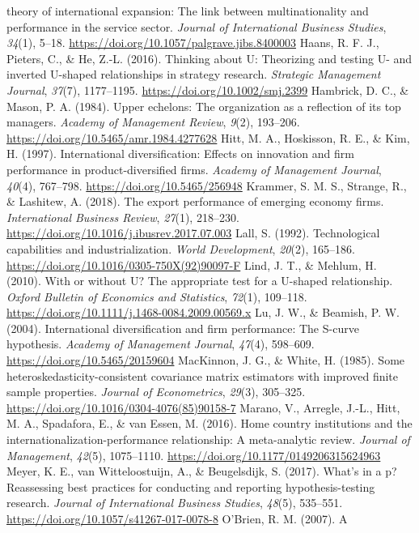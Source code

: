 \documentclass[12pt,a4paper]{article}
\begin{document}
theory of international expansion: The link between multinationality and
performance in the service sector. \emph{Journal of International
Business Studies}, \emph{34}(1), 5--18.
\url{https://doi.org/10.1057/palgrave.jibs.8400003} Haans, R. F. J.,
Pieters, C., \& He, Z.-L. (2016). Thinking about U: Theorizing and
testing U- and inverted U-shaped relationships in strategy research.
\emph{Strategic Management Journal}, \emph{37}(7), 1177--1195.
\url{https://doi.org/10.1002/smj.2399} Hambrick, D. C., \& Mason, P. A.
(1984). Upper echelons: The organization as a reflection of its top
managers. \emph{Academy of Management Review}, \emph{9}(2), 193--206.
\url{https://doi.org/10.5465/amr.1984.4277628} Hitt, M. A., Hoskisson,
R. E., \& Kim, H. (1997). International diversification: Effects on
innovation and firm performance in product-diversified firms.
\emph{Academy of Management Journal}, \emph{40}(4), 767--798.
\url{https://doi.org/10.5465/256948} Krammer, S. M. S., Strange, R., \&
Lashitew, A. (2018). The export performance of emerging economy firms.
\emph{International Business Review}, \emph{27}(1), 218--230.
\url{https://doi.org/10.1016/j.ibusrev.2017.07.003} Lall, S. (1992).
Technological capabilities and industrialization. \emph{World
Development}, \emph{20}(2), 165--186.
\url{https://doi.org/10.1016/0305-750X(92)90097-F} Lind, J. T., \&
Mehlum, H. (2010). With or without U? The appropriate test for a
U-shaped relationship. \emph{Oxford Bulletin of Economics and
Statistics}, \emph{72}(1), 109--118.
\url{https://doi.org/10.1111/j.1468-0084.2009.00569.x} Lu, J. W., \&
Beamish, P. W. (2004). International diversification and firm
performance: The S-curve hypothesis. \emph{Academy of Management
Journal}, \emph{47}(4), 598--609. \url{https://doi.org/10.5465/20159604}
MacKinnon, J. G., \& White, H. (1985). Some
heteroskedasticity-consistent covariance matrix estimators with improved
finite sample properties. \emph{Journal of Econometrics}, \emph{29}(3),
305--325. \url{https://doi.org/10.1016/0304-4076(85)90158-7} Marano, V.,
Arregle, J.-L., Hitt, M. A., Spadafora, E., \& van Essen, M. (2016).
Home country institutions and the internationalization-performance
relationship: A meta-analytic review. \emph{Journal of Management},
\emph{42}(5), 1075--1110. \url{https://doi.org/10.1177/0149206315624963}
Meyer, K. E., van Witteloostuijn, A., \& Beugelsdijk, S. (2017). What's
in a p? Reassessing best practices for conducting and reporting
hypothesis-testing research. \emph{Journal of International Business
Studies}, \emph{48}(5), 535--551.
\url{https://doi.org/10.1057/s41267-017-0078-8} O'Brien, R. M. (2007). A
\end{document}
